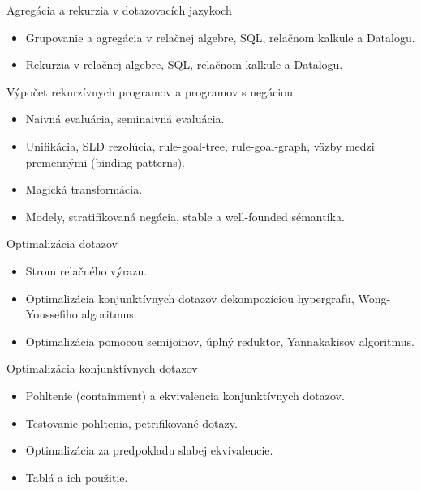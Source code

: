 \documentclass[a4paper]{report}
\begin{document}
\begin{zadanie}{Agregácia a rekurzia v dotazovacích jazykoch}
\begin{itemize}
 \item Grupovanie a agregácia v relačnej algebre, SQL, relačnom kalkule a Datalogu.
 \item Rekurzia v relačnej algebre, SQL, relačnom kalkule a Datalogu.
\end{itemize}
\end{zadanie}

\begin{zadanie}{Výpočet rekurzívnych programov a programov s negáciou}
\begin{itemize}
 \item Naivná evaluácia, seminaivná evaluácia.
 \item Unifikácia, SLD rezolúcia, rule-goal-tree, rule-goal-graph, väzby medzi premennými (binding patterns).
 \item Magická transformácia.
 \item Modely, stratifikovaná negácia, stable a well-founded sémantika.
\end{itemize}
\end{zadanie}

\begin{zadanie}{Optimalizácia dotazov}
\begin{itemize}
 \item Strom relačného výrazu.
 \item Optimalizácia konjunktívnych dotazov dekompozíciou hypergrafu, Wong-Youssefiho algoritmus.
 \item Optimalizácia pomocou semijoinov, úplný reduktor, Yannakakisov algoritmus.
\end{itemize}
\end{zadanie}

\begin{zadanie}{Optimalizácia konjunktívnych dotazov}
\begin{itemize}
 \item Pohltenie (containment) a ekvivalencia konjunktívnych dotazov.
 \item Testovanie pohltenia, petrifikované dotazy.
 \item Optimalizácia za predpokladu slabej ekvivalencie.
 \item Tablá a ich použitie.
\end{itemize}
\end{zadanie}
\end{document}

